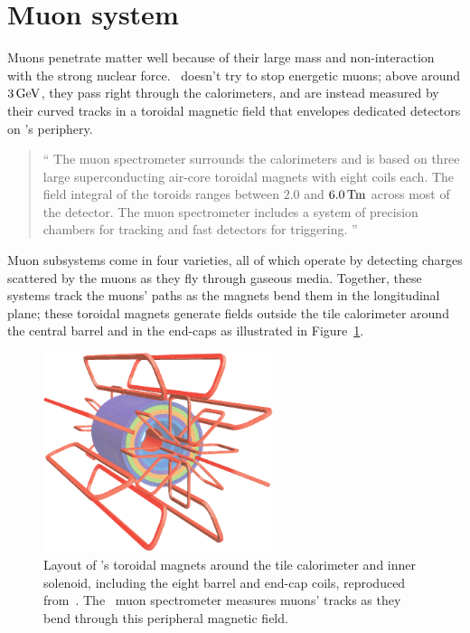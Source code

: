 \section{Muon system}
\label{sec:atlas_muon}
Muons penetrate matter well because of their large mass and non-interaction
with the strong nuclear force.
\atlas\ doesn't try to stop energetic muons;
above around $3\,\eV[G]$, they pass right through the calorimeters, and are
instead measured by their curved tracks in a toroidal magnetic field that
envelopes dedicated detectors on \atlas's periphery.
\begin{quote}
``%
The muon spectrometer surrounds the calorimeters and is based on three large
superconducting air-core toroidal magnets with eight coils each.
The field integral of the toroids ranges between $2.0$ and
$6.0\,\mathrm{T\kern-0.15ex m}$ across most of the detector.
The muon spectrometer includes a system of precision chambers for tracking and
fast detectors for triggering.%
''~\cite{atlas2022searches}
\end{quote}
Muon subsystems come in four varieties, all of which operate by detecting
charges scattered by the muons as they fly through gaseous media.
Together, these systems track the muons' paths as the magnets bend them in the
longitudinal plane; these toroidal magnets generate fields outside the tile
calorimeter around the central barrel and in the end-caps as illustrated in
Figure~\ref{fig:atlas_magnets}.

\begin{figure}[tp]
\centering
\includegraphics[width=0.6\textwidth]{figures/atlas_magnets.pdf}
\caption[
Layout of \atlas's toroidal magnets around the tile calorimeter and inner
solenoid
]{%
Layout of \atlas's toroidal magnets around the tile calorimeter and inner
solenoid, including the eight barrel and end-cap coils,
reproduced from~\cite{atlas2008experiment}.
The \atlas\ muon spectrometer measures muons' tracks as they bend through
this peripheral magnetic field.
}
\label{fig:atlas_magnets}
\end{figure}

